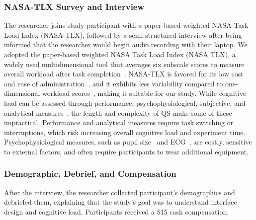 \subsubsection{NASA-TLX Survey and Interview}
The researcher joins study participant with a paper-based weighted NASA Task Load Index (NASA TLX), followed by a semi-structured interview after being informed that the researcher would begin audio recording with their laptop. We adopted the paper-based weighted NASA Task Load Index (NASA TLX), a widely used multidimensional tool that averages six subscale scores to measure overall workload after task completion~\cite{hart1988development, hartNasaTaskLoadIndex2006, cain2007review}. NASA-TLX is favored for its low cost and ease of administration~\cite{gaoMentalWorkloadMeasurement2013}, and it exhibits less variability compared to one-dimensional workload scores~\cite{rubioEvaluationSubjectiveMental2004}, making it suitable for our study. While cognitive load can be assessed through performance, psychophysiological, subjective, and analytical measures~\cite{gaoMentalWorkloadMeasurement2013}, the length and complexity of QS make some of these impractical. Performance and analytical measures require task switching or interruptions, which risk increasing overall cognitive load and experiment time. Psychophysiological measures, such as pupil size~\cite{palinkoEstimatingCognitiveLoad2010} and ECG~\cite{haapalainenPsychophysiologicalMeasuresAssessing2010}, are costly, sensitive to external factors, and often require participants to wear additional equipment.

\subsubsection{Demographic, Debrief, and Compensation}
After the interview, the researcher collected participant's demographics and debriefed them, explaining that the study's goal was to understand interface design and cognitive load. Participants received a \$15 cash compensation.





